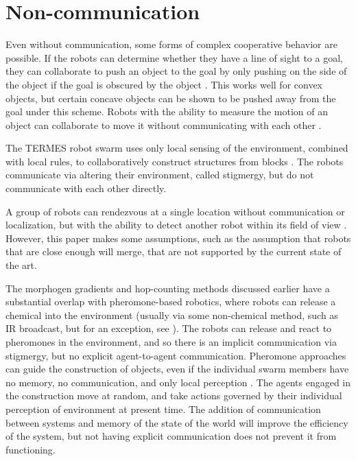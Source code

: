 \documentclass[]{article}
\begin{document}
\section{Non-communication}

Even without communication, some forms of complex cooperative behavior are possible. 
If the robots can determine whether they have a line of sight to a goal, they can collaborate to push an object to the goal by only pushing on the side of the object if the goal is obscured by the object \cite{chen2015occlusion}. This works well for convex objects, but certain concave objects can be shown to be pushed away from the goal under this scheme. Robots with the ability to measure the motion of an object can collaborate to move it without communicating with each other \cite{wang2015multi}.

The TERMES robot swarm uses only local sensing of the environment, combined with local rules, to collaboratively construct structures from blocks \cite{werfel2014designing}. 
The robots communicate via altering their environment, called stigmergy, but do not communicate with each other directly. 

A group of robots can rendezvous at a single location without communication or localization, but with the ability to detect another robot within its field of view \cite{yu2012rendezvous}. However, this paper makes some assumptions, such as the assumption that robots that are close enough will merge, that are not supported by the current state of the art. 

The morphogen gradients and hop-counting methods discussed earlier have a substantial overlap with pheromone-based robotics, where robots can release a chemical into the environment (usually via some non-chemical method, such as IR broadcast, but for an exception, see \cite{hayes2001swarm}). 
The robots can release and react to pheromones in the environment, and so there is an implicit communication via stigmergy, but no explicit agent-to-agent communication. 
Pheromone approaches can guide the construction of objects, even if the individual swarm members have no memory, no communication, and only local perception \cite{mason2003programming, wawerla2002collective, bowyer2000automated}.
The agents engaged in the construction move at random, and take actions governed by their individual perception of environment at present time. 
The addition of communication between systems and memory of the state of the world will improve the efficiency of the system, but not having explicit communication does not prevent it from functioning.
\end{document}
